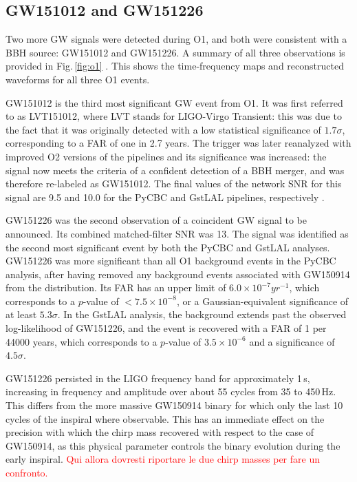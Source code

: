 \documentclass[binding=0.6cm, LaM]{sapthesis}
\newcommand{\fpg}[1]{\textcolor{red}{#1} }
\begin{document}
\subsection{GW151012 and GW151226}

	Two more GW signals were detected during O1, and both were consistent with a BBH source: 
	GW151012 and GW151226.  
	A summary of all three observations is provided in Fig.\,\ref{fig:o1} \cite{13}.  
	This shows the time-frequency maps and reconstructed waveforms for all three O1 events.

	GW151012 is the third most significant GW event from O1.  
	It was first referred to as LVT151012, where LVT stands for LIGO-Virgo Transient: 
	this was due to the fact that it was originally detected with a low statistical significance of $1.7\sigma$, 
	corresponding to a FAR of one in 2.7 years.  
	The trigger was later reanalyzed with improved O2 versions of the pipelines and its significance was increased: 
	the signal now meets the criteria of a confident detection of a BBH merger, 
	and was therefore re-labeled as GW151012.  
	The final values of the network SNR for this signal are 9.5 and 10.0 
	for the {\ttfamily PyCBC} and {\ttfamily GstLAL} pipelines, respectively \cite{13}.

	GW151226 was the second observation of a coincident GW signal to be announced. 
	Its combined matched-filter SNR was 13. 
	The signal was identified as the second most significant event by both the {\ttfamily PyCBC} and {\ttfamily GstLAL} analyses.
	GW151226 was more significant than all O1 background events in the {\ttfamily PyCBC} analysis, 
	after having removed any background events associated with GW150914 from the distribution.
	Its FAR has an upper limit of $6.0 \times 10^{-7} yr^{-1}$, which
        corresponds to a $p$-value of $< 7.5 \times 10^{-8}$, or a Gaussian-equivalent significance of at least $5.3\sigma$. 
	In the {\ttfamily GstLAL} analysis, the background extends past the observed log-likelihood of GW151226, 
	and the event is recovered with a FAR of 1 per 44000 years, which corresponds to a $p$-value of $3.5\times 10^{-6}$ and a significance of $4.5\sigma$.

	GW151226 persisted in the LIGO frequency band for approximately 1\,s, 
	increasing in frequency and amplitude over about 55 cycles from 35 to 450\,Hz. 
	This differs from the more massive GW150914 binary for which only the last 10 cycles of the inspiral where observable.  
	This has an immediate effect on the precision with which the chirp mass \cite{126, 127} 
	recovered with respect to the case of GW150914, as this physical parameter controls the binary evolution during the early inspiral.  
	\fpg{Qui allora dovresti riportare le due chirp masses per fare un confronto.}
\end{document}
